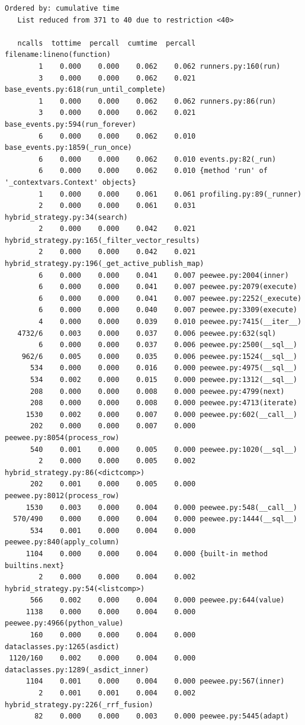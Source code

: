 \documentclass[a4paper,12pt]{article}
\begin{document}
\begin{lstlisting}[basicstyle=\ttfamily\fontsize{9}{9}\selectfont]
   Ordered by: cumulative time
   List reduced from 371 to 40 due to restriction <40>

   ncalls  tottime  percall  cumtime  percall filename:lineno(function)
        1    0.000    0.000    0.062    0.062 runners.py:160(run)
        3    0.000    0.000    0.062    0.021 base_events.py:618(run_until_complete)
        1    0.000    0.000    0.062    0.062 runners.py:86(run)
        3    0.000    0.000    0.062    0.021 base_events.py:594(run_forever)
        6    0.000    0.000    0.062    0.010 base_events.py:1859(_run_once)
        6    0.000    0.000    0.062    0.010 events.py:82(_run)
        6    0.000    0.000    0.062    0.010 {method 'run' of '_contextvars.Context' objects}
        1    0.000    0.000    0.061    0.061 profiling.py:89(_runner)
        2    0.000    0.000    0.061    0.031 hybrid_strategy.py:34(search)
        2    0.000    0.000    0.042    0.021 hybrid_strategy.py:165(_filter_vector_results)
        2    0.000    0.000    0.042    0.021 hybrid_strategy.py:196(_get_active_publish_map)
        6    0.000    0.000    0.041    0.007 peewee.py:2004(inner)
        6    0.000    0.000    0.041    0.007 peewee.py:2079(execute)
        6    0.000    0.000    0.041    0.007 peewee.py:2252(_execute)
        6    0.000    0.000    0.040    0.007 peewee.py:3309(execute)
        4    0.000    0.000    0.039    0.010 peewee.py:7415(__iter__)
   4732/6    0.003    0.000    0.037    0.006 peewee.py:632(sql)
        6    0.000    0.000    0.037    0.006 peewee.py:2500(__sql__)
    962/6    0.005    0.000    0.035    0.006 peewee.py:1524(__sql__)
      534    0.000    0.000    0.016    0.000 peewee.py:4975(__sql__)
      534    0.002    0.000    0.015    0.000 peewee.py:1312(__sql__)
      208    0.000    0.000    0.008    0.000 peewee.py:4799(next)
      208    0.000    0.000    0.008    0.000 peewee.py:4713(iterate)
     1530    0.002    0.000    0.007    0.000 peewee.py:602(__call__)
      202    0.000    0.000    0.007    0.000 peewee.py:8054(process_row)
      540    0.001    0.000    0.005    0.000 peewee.py:1020(__sql__)
        2    0.000    0.000    0.005    0.002 hybrid_strategy.py:86(<dictcomp>)
      202    0.001    0.000    0.005    0.000 peewee.py:8012(process_row)
     1530    0.003    0.000    0.004    0.000 peewee.py:548(__call__)
  570/490    0.000    0.000    0.004    0.000 peewee.py:1444(__sql__)
      534    0.001    0.000    0.004    0.000 peewee.py:840(apply_column)
     1104    0.000    0.000    0.004    0.000 {built-in method builtins.next}
        2    0.000    0.000    0.004    0.002 hybrid_strategy.py:54(<listcomp>)
      566    0.002    0.000    0.004    0.000 peewee.py:644(value)
     1138    0.000    0.000    0.004    0.000 peewee.py:4966(python_value)
      160    0.000    0.000    0.004    0.000 dataclasses.py:1265(asdict)
 1120/160    0.002    0.000    0.004    0.000 dataclasses.py:1289(_asdict_inner)
     1104    0.001    0.000    0.004    0.000 peewee.py:567(inner)
        2    0.001    0.001    0.004    0.002 hybrid_strategy.py:226(_rrf_fusion)
       82    0.000    0.000    0.003    0.000 peewee.py:5445(adapt)



\end{lstlisting}
\end{document}
